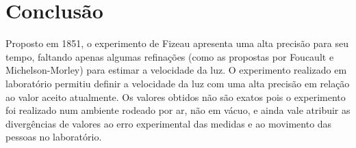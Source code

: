 \section{Conclusão}
Proposto em 1851, o experimento de Fizeau apresenta uma alta precisão
para seu tempo, faltando apenas algumas refinações (como as propostas
por Foucault e Michelson-Morley) para estimar a velocidade da luz. O
experimento realizado em laboratório permitiu definir a velocidade da
luz com uma alta precisão em relação ao valor aceito atualmente. Os
valores obtidos não são exatos pois o experimento foi realizado num
ambiente rodeado por ar, não em vácuo, e ainda vale atribuir as
divergências de valores ao erro experimental das medidas e ao
movimento das pessoas no laboratório. 
